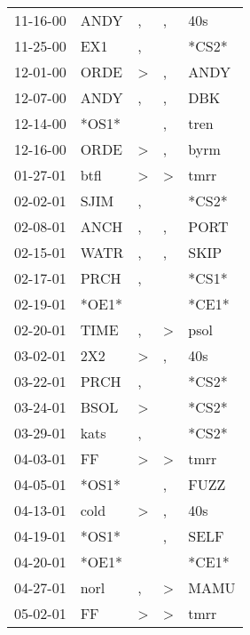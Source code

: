 \begin{supertabular}{lllll}
 11-16-00 &   ANDY &                , &                , &    40s \\
 11-25-00 &    EX1 &                , &                  &  *CS2* \\
 12-01-00 &   ORDE &     \textgreater &                , &   ANDY \\
 12-07-00 &   ANDY &                , &                , &    DBK \\
 12-14-00 &  *OS1* &                  &                , &   tren \\
 12-16-00 &   ORDE &     \textgreater &                , &   byrm \\
 01-27-01 &   btfl &     \textgreater &     \textgreater &   tmrr \\
 02-02-01 &   SJIM &                , &                  &  *CS2* \\
 02-08-01 &   ANCH &                , &                , &   PORT \\
 02-15-01 &   WATR &                , &                , &   SKIP \\
 02-17-01 &   PRCH &                , &                  &  *CS1* \\
 02-19-01 &  *OE1* &                  &                  &  *CE1* \\
 02-20-01 &   TIME &                , &     \textgreater &   psol \\
 03-02-01 &    2X2 &     \textgreater &                , &    40s \\
 03-22-01 &   PRCH &                , &                  &  *CS2* \\
 03-24-01 &   BSOL &     \textgreater &                  &  *CS2* \\
 03-29-01 &   kats &                , &                  &  *CS2* \\
 04-03-01 &     FF &     \textgreater &     \textgreater &   tmrr \\
 04-05-01 &  *OS1* &                  &                , &   FUZZ \\
 04-13-01 &   cold &     \textgreater &                , &    40s \\
 04-19-01 &  *OS1* &                  &                , &   SELF \\
 04-20-01 &  *OE1* &                  &                  &  *CE1* \\
 04-27-01 &   norl &                , &     \textgreater &   MAMU \\
 05-02-01 &     FF &     \textgreater &     \textgreater &   tmrr \\

\end{supertabular}
